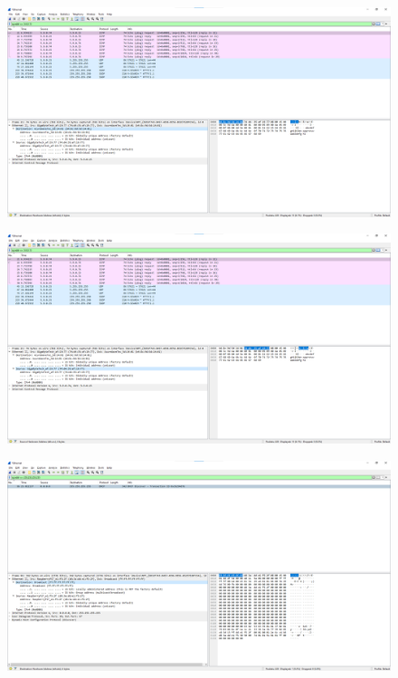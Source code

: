 
\begin{figure}[p]
    \centering
    \includegraphics[width=1\textwidth]{./assets/3.7.a.destination.png}
    \caption{}
    \label{fig:3.7.a.destination}
\end{figure}

\begin{figure}[p]
    \centering
    \includegraphics[width=1\textwidth]{./assets/3.7.a.source.png}
    \caption{}
    \label{fig:3.7.a.source}
\end{figure}

\begin{figure}[p]
    \centering
    \includegraphics[width=1\textwidth]{./assets/3.7.b.destination.png}
    \caption{}
    \label{fig:3.7.b.destination}
\end{figure}

